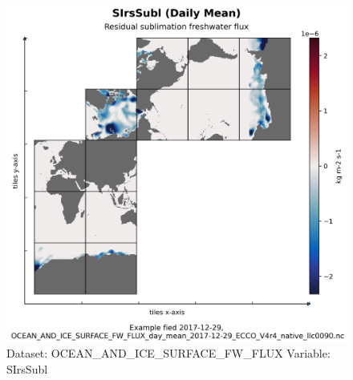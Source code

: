 \begin{figure}[H]
\centering
\includegraphics[width=\textwidth]{../images/plots/native_plots/Ocean_and_Sea-Ice_Surface_Freshwater_Fluxes/SIrsSubl.png}
\caption{Dataset: OCEAN\_AND\_ICE\_SURFACE\_FW\_FLUX Variable: SIrsSubl}
\label{tab:table-OCEAN_AND_ICE_SURFACE_FW_FLUX_SIrsSubl-Plot}
\end{figure}
\pagebreak
